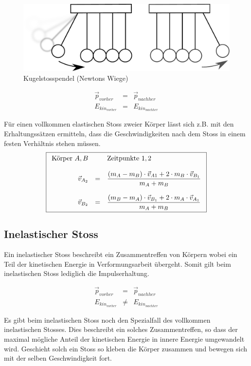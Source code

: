 \begin{figure}[h!]
	\centering
	\includegraphics[scale=0.4]{../fig/kugelstosspendel.pdf}
	\caption{Kugelstosspendel (Newtons Wiege)}
\end{figure}

\[ \boxed{
	\begin{array}{rcl}
		\vec{p}_{vorher} &= &\vec{p}_{nachher} \\
		E_{kin_{vorher}} &= &E_{kin_{nachher}}
	\end{array}
}\]

\noindent
Für einen vollkommen elastischen Stoss zweier Körper lässt sich z.B. mit
den Erhaltungssätzen ermitteln, dass die Geschwindigkeiten nach dem Stoss
in einem festen Verhältnis stehen müssen.
\[ \boxed{\begin{array}{r c l}
	\text{Körper } A,B & & \text{Zeitpunkte } 1,2  \\
	& & \\
	\vec{v}_{A_2} & = & \displaystyle
		\frac{(m_A-m_B)\cdot\vec{v}_{A1}
			+2\cdot m_B\cdot\vec{v}_{B_1}}
			{m_A + m_B} \\
	& & \\
	\vec{v}_{B_2} & = & \displaystyle
		\frac{(m_B-m_A)\cdot\vec{v}_{B_1}
			+2\cdot m_A \cdot \vec{v}_{A_1}}
			{m_A + m_B}
\end{array}} \]

\subsection{Inelastischer Stoss}
Ein inelastischer Stoss beschreibt ein Zusammentreffen von Körpern wobei ein
Teil der kinetischen Energie in Verformungsarbeit übergeht. Somit gilt beim
inelastischen Stoss lediglich die Impulserhaltung. 

\[ \boxed{
	\begin{array}{rcl}
		\vec{p}_{vorher} &= &\vec{p}_{nachher} \\
		E_{kin_{vorher}} &\neq &E_{kin_{nachher}}
	\end{array}
} \]

\noindent
Es gibt beim inelastischen Stoss noch den Spezialfall des vollkommen 
inelastischen Stosses. Dies beschreibt ein solches Zusammentreffen, so dass
der maximal mögliche Anteil der kinetischen Energie in innere Energie
umgewandelt wird. Geschieht solch ein Stoss so kleben die Körper zusammen
und bewegen sich mit der selben Geschwindigkeit fort.


